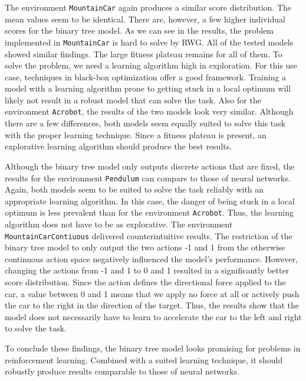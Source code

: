 The environment \verb|MountainCar| again produces a similar score distribution. The mean values seem to be identical. There are, however, a few higher individual scores for the binary tree model. As we can see in the results, the problem implemented in \verb|MountainCar| is hard to solve by RWG. All of the tested models showed similar findings. The large fitness plateau remains for all of them. To solve the problem, we need a learning algorithm high in exploration. For this use case, techniques in black-box optimization offer a good framework. Training a model with a learning algorithm prone to getting stuck in a local optimum will likely not result in a robust model that can solve the task. Also for the environment \verb|Acrobot|, the results of the two models look very similar. Although there are a few differences, both models seem equally suited to solve this task with the proper learning technique. Since a fitness plateau is present, an explorative learning algorithm should produce the best results.

Although the binary tree model only outputs discrete actions that are fixed, the results for the environment \verb|Pendulum| can compare to those of neural networks. Again, both models seem to be suited to solve the task reliably with an appropriate learning algorithm. In this case, the danger of being stuck in a local optimum is less prevalent than for the environment \verb|Acrobot|. Thus, the learning algorithm does not have to be as explorative. The environment \verb|MountainCarContiuous| delivered counterintuitive results. The restriction of the binary tree model to only output the two actions -1 and 1 from the otherwise continuous action space negatively influenced the model's performance. However, changing the actions from -1 and 1 to 0 and 1 resulted in a significantly better score distribution. Since the action defines the directional force applied to the car, a value between 0 and 1 means that we apply no force at all or actively push the car to the right in the direction of the target. Thus, the results show that the model does not necessarily have to learn to accelerate the car to the left and right to solve the task.

To conclude these findings, the binary tree model looks promising for problems in reinforcement learning. Combined with a suited learning technique, it should robustly produce results comparable to those of neural networks.

